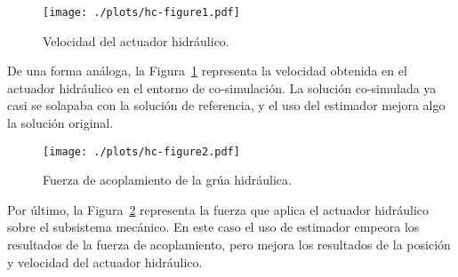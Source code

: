 \begin{figure}[ht!]\centering
	\texttt{[image: ./plots/hc-figure1.pdf]}
	\caption{Velocidad del actuador hidráulico.}
	\label{fig:GruaVel}
\end{figure}

De una forma análoga, la Figura~\ref{fig:GruaVel} representa la velocidad obtenida en el actuador hidráulico en el entorno de co-simulación.
La solución co-simulada ya casi se solapaba con la solución de referencia, y el uso del estimador mejora algo la solución original.

\begin{figure}[ht!]\centering
	\texttt{[image: ./plots/hc-figure2.pdf]}
	\caption{Fuerza de acoplamiento de la grúa hidráulica.}
	\label{fig:GruaFor}
\end{figure}

Por último, la Figura~\ref{fig:GruaFor} representa la fuerza que aplica el actuador hidráulico sobre el subsistema mecánico.
En este caso el uso de estimador empeora los resultados de la fuerza de acoplamiento, pero mejora los resultados de la posición y velocidad del actuador hidráulico.


